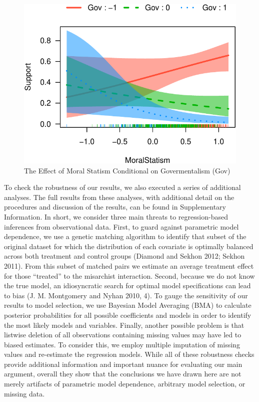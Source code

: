 \documentclass[12pt,]{article}
\begin{document}
\begin{figure}[htbp]
\centering
\includegraphics{figures/effect-plot2-1.pdf}
\caption{The Effect of Moral Statism Conditional on Govermentalism
(Gov)}
\end{figure}

To check the robustness of our results, we also executed a series of
additional analyses. The full results from these analyses, with
additional detail on the procedures and discussion of the results, can
be found in Supplementary Information. In short, we consider three main
threats to regression-based inferences from observational data. First,
to guard against parametric model dependence, we use a genetic matching
algorithm to identify that subset of the original dataset for which the
distribution of each covariate is optimally balanced across both
treatment and control groups (Diamond and Sekhon 2012; Sekhon 2011).
From this subset of matched pairs we estimate an average treatment
effect for those ``treated'' to the misarchist interaction. Second,
because we do not know the true model, an idiosyncratic search for
optimal model specifications can lead to bias (J. M. Montgomery and
Nyhan 2010, 4). To gauge the sensitivity of our results to model
selection, we use Bayesian Model Averaging (BMA) to calculate posterior
probabilities for all possible coefficients and models in order to
identify the most likely models and variables. Finally, another possible
problem is that listwise deletion of all observations containing missing
values may have led to biased estimates. To consider this, we employ
multiple imputation of missing values and re-estimate the regression
models. While all of these robustness checks provide additional
information and important nuance for evaluating our main argument,
overall they show that the conclusions we have drawn here are not merely
artifacts of parametric model dependence, arbitrary model selection, or
missing data.
\end{document}
